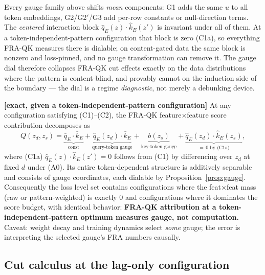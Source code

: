 \documentclass{article}
\begin{document}
\begin{prop}
\begin{remark}\label{rem:dialinvariant}
Every gauge family above shifts \emph{mean} components: G1 adds the same $u$ to all token embeddings, G2/G2$'$/G3 add per-row constants or null-direction terms. The \emph{centered} interaction block $\hat q_E(z)\cdot\hat k_E(z')$ is invariant under all of them. At a token-independent-pattern configuration that block is zero (C1a), so everything FRA-QK measures there is dialable; on content-gated data the same block is nonzero and loss-pinned, and no gauge transformation can remove it. The gauge dial therefore collapses FRA-QK cut effects exactly on the data distributions where the pattern is content-blind, and provably cannot on the induction side of the boundary --- the dial is a regime \emph{diagnostic}, not merely a debunking device.
\end{remark}
\end{prop}

\begin{prop}\label{prop:featfeat}
\textbf{[exact, given a token-independent-pattern configuration]} At any configuration satisfying (C1)--(C2), the FRA-QK feature$\times$feature score contribution decomposes as
\begin{equation}
    Q(z_d, z_s) = \underbrace{\bar q_E\cdot\bar k_E}_{\text{const}}
    + \underbrace{\hat q_E(z_d)\cdot\bar k_E}_{\text{query-token gauge}}
    + \underbrace{b(z_s)}_{\text{key-token gauge}}
    + \underbrace{\hat q_E(z_d)\cdot\hat k_E(z_s)}_{=\,0 \text{ by (C1a)}} ,
\end{equation}
where (C1a) $\hat q_E(z)\cdot\hat k_E(z') = 0$ follows from (C1) by differencing over $z_d$ at fixed $d$ under (A0). Its entire token-dependent structure is additively separable and consists of gauge coordinates, each dialable by Proposition~\ref{prop:gauge}. Consequently the loss level set contains configurations where the feat$\times$feat mass (raw or pattern-weighted) is exactly $0$ and configurations where it dominates the score budget, with identical behavior: \textbf{FRA-QK attribution at a token-independent-pattern optimum measures gauge, not computation.} Caveat: weight decay and training dynamics select \emph{some} gauge; the error is interpreting the selected gauge's FRA numbers causally.
\end{prop}

\subsection{Cut calculus at the lag-only configuration}
\end{document}
